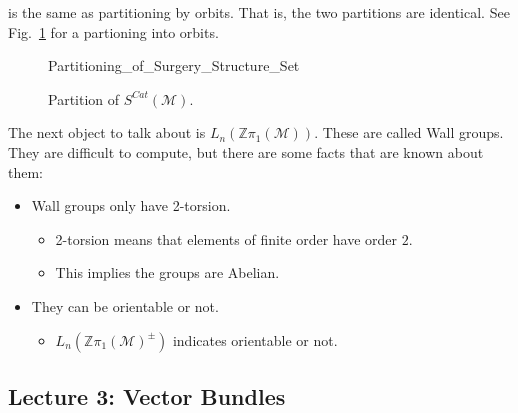 \documentclass[crop=false,class=article,oneside]{standalone}
\begin{document}
            is the same as partitioning by orbits. That is,
            the two partitions are identical. See
            Fig.~\ref{fig:surgery_theory_partition_of_S_Cat}
            for a partioning into orbits.
            \begin{figure}[H]
                \centering
                \captionsetup{type=figure}
                
                          {Partitioning_of_Surgery_Structure_Set}
                \caption{Partition of $S^{Cat}(\mathcal{M})$.}
                \label{fig:surgery_theory_partition_of_S_Cat}
            \end{figure}
            The next object to talk about is
            $L_{n}(\mathbb{Z}\pi_{1}(\mathcal{M}))$.
            These are called Wall groups.
            They are difficult to compute,
            but there are some facts that are known about them:
            \begin{itemize}
                \item Wall groups only have 2-torsion.
                \begin{itemize}
                    \item 2-torsion means that elements
                          of finite order have order $2$.
                    \item This implies the groups are Abelian.
                \end{itemize}
                \item They can be orientable or not.
                \begin{itemize}
                    \item $L_{n}(%
                           \mathbb{Z}\pi_{1}(\mathcal{M})^{\pm})$
                           indicates orientable or not.
                \end{itemize}
            \end{itemize}
    \subsection{Lecture 3: Vector Bundles}
\end{document}
